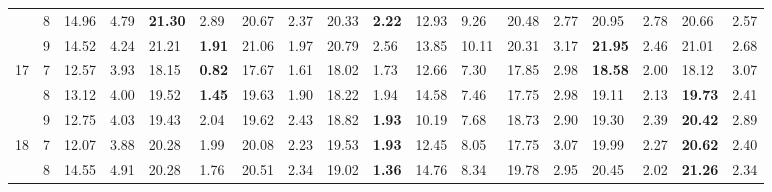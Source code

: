 \documentclass[conference]{IEEEtran}
\begin{document}
\begin{table}[]
\begin{tabular}{|cl|ll|ll|ll|ll|ll|ll|ll|ll|}
		\multicolumn{1}{|c|}{} & 8 & \multicolumn{1}{l|}{14.96} & 4.79 & \multicolumn{1}{l|}{\textbf{21.30}} & 2.89 & \multicolumn{1}{l|}{20.67} & 2.37 & \multicolumn{1}{l|}{20.33} & \textbf{2.22} & \multicolumn{1}{l|}{12.93} & 9.26 & \multicolumn{1}{l|}{20.48} & 2.77 & \multicolumn{1}{l|}{20.95} & 2.78 & \multicolumn{1}{l|}{20.66} & 2.57 \\ \cline{2-18} 
		\multicolumn{1}{|c|}{} & 9 & \multicolumn{1}{l|}{14.52} & 4.24 & \multicolumn{1}{l|}{21.21} & \textbf{1.91} & \multicolumn{1}{l|}{21.06} & 1.97 & \multicolumn{1}{l|}{20.79} & 2.56 & \multicolumn{1}{l|}{13.85} & 10.11 & \multicolumn{1}{l|}{20.31} & 3.17 & \multicolumn{1}{l|}{\textbf{21.95}} & 2.46 & \multicolumn{1}{l|}{21.01} & 2.68 \\ \hline
		\multicolumn{1}{|c|}{\multirow{3}{*}{17}} & 7 & \multicolumn{1}{l|}{12.57} & 3.93 & \multicolumn{1}{l|}{18.15} & \textbf{0.82} & \multicolumn{1}{l|}{17.67} & 1.61 & \multicolumn{1}{l|}{18.02} & 1.73 & \multicolumn{1}{l|}{12.66} & 7.30 & \multicolumn{1}{l|}{17.85} & 2.98 & \multicolumn{1}{l|}{\textbf{18.58}} & 2.00 & \multicolumn{1}{l|}{18.12} & 3.07 \\ \cline{2-18} 
		\multicolumn{1}{|c|}{} & 8 & \multicolumn{1}{l|}{13.12} & 4.00 & \multicolumn{1}{l|}{19.52} & \textbf{1.45} & \multicolumn{1}{l|}{19.63} & 1.90 & \multicolumn{1}{l|}{18.22} & 1.94 & \multicolumn{1}{l|}{14.58} & 7.46 & \multicolumn{1}{l|}{17.75} & 2.98 & \multicolumn{1}{l|}{19.11} & 2.13 & \multicolumn{1}{l|}{\textbf{19.73}} & 2.41 \\ \cline{2-18} 
		\multicolumn{1}{|c|}{} & 9 & \multicolumn{1}{l|}{12.75} & 4.03 & \multicolumn{1}{l|}{19.43} & 2.04 & \multicolumn{1}{l|}{19.62} & 2.43 & \multicolumn{1}{l|}{18.82} & \textbf{1.93} & \multicolumn{1}{l|}{10.19} & 7.68 & \multicolumn{1}{l|}{18.73} & 2.90 & \multicolumn{1}{l|}{19.30} & 2.39 & \multicolumn{1}{l|}{\textbf{20.42}} & 2.89 \\ \hline
		\multicolumn{1}{|c|}{\multirow{3}{*}{18}} & 7 & \multicolumn{1}{l|}{12.07} & 3.88 & \multicolumn{1}{l|}{20.28} & 1.99 & \multicolumn{1}{l|}{20.08} & 2.23 & \multicolumn{1}{l|}{19.53} & \textbf{1.93} & \multicolumn{1}{l|}{12.45} & 8.05 & \multicolumn{1}{l|}{17.75} & 3.07 & \multicolumn{1}{l|}{19.99} & 2.27 & \multicolumn{1}{l|}{\textbf{20.62}} & 2.40 \\ \cline{2-18} 
		\multicolumn{1}{|c|}{} & 8 & \multicolumn{1}{l|}{14.55} & 4.91 & \multicolumn{1}{l|}{20.28} & 1.76 & \multicolumn{1}{l|}{20.51} & 2.34 & \multicolumn{1}{l|}{19.02} & \textbf{1.36} & \multicolumn{1}{l|}{14.76} & 8.34 & \multicolumn{1}{l|}{19.78} & 2.95 & \multicolumn{1}{l|}{20.45} & 2.02 & \multicolumn{1}{l|}{\textbf{21.26}} & 2.34 \\ \cline{2-18} 

\end{tabular}
\end{table}
\end{document}
